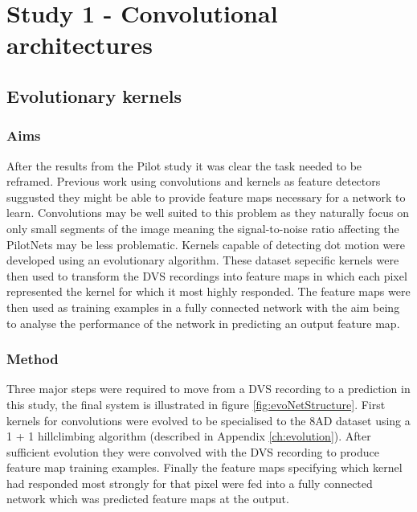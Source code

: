 \chapter{Study 1 - Convolutional architectures}
\label{ch:convolutions}

\section{Evolutionary kernels}

\subsection{Aims}
After the results from the Pilot study it was clear the task needed to be reframed.
Previous work using convolutions and kernels as feature detectors suggusted they might be able to provide feature maps necessary for a network to learn.
Convolutions may be well suited to this problem as they naturally focus on only small segments of the image meaning the signal-to-noise ratio affecting the PilotNets may be less problematic. 
Kernels capable of detecting dot motion were developed using an evolutionary algorithm. 
These dataset sepecific kernels were then used to transform the DVS recordings into feature maps in which each pixel represented the kernel for which it most highly responded. 
The feature maps were then used as training examples in a fully connected network with the aim being to analyse the performance of the network in predicting an output feature map. 



\subsection{Method}
Three major steps were required to move from a DVS recording to a prediction in this study, the final system is illustrated in figure \ref{fig:evoNetStructure}.
First kernels for convolutions were evolved to be specialised to the 8AD dataset using a 1 + 1 hillclimbing algorithm (described in Appendix \ref{ch:evolution}). 
After sufficient evolution they were convolved with the DVS recording to produce feature map training examples.
Finally the feature maps specifying which kernel had responded most strongly for that pixel were fed into a fully connected network which was predicted feature maps at the output.  

